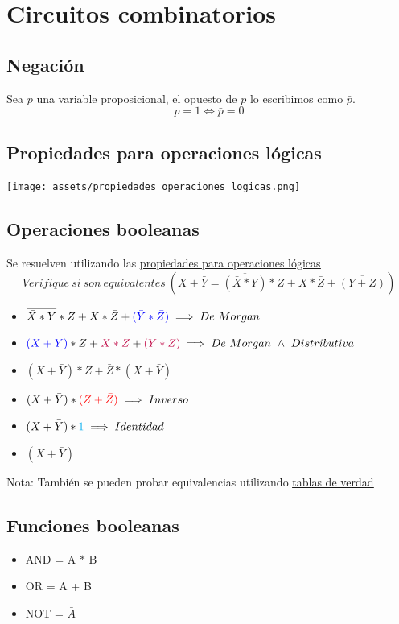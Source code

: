 \documentclass[10pt,a4paper]{article}
\begin{document}
\section{Circuitos combinatorios}
\subsection*{Negación}
Sea \(p\) una variable proposicional, el opuesto de \(p\) lo escribimos como \(\bar{p}\).
\[ p = 1 \iff \bar{p} = 0 \]

\subsection*{Propiedades para operaciones lógicas} 
\label{subsec:PPOL}
\begin{minipage}[b]{0.6\textwidth}
    \texttt{[image: assets/propiedades\_operaciones\_logicas.png]}
    \label{fig:propiedades_operaciones_logicas}
\end{minipage}
\subsection*{Operaciones booleanas}
Se resuelven utilizando las \hyperref[subsec:PPOL]{\underline{propiedades para operaciones lógicas}}
\[Verifique \ si \ son \ equivalentes \ (X + \bar{Y} = \overline{(\bar{X} \ast Y)} \ast Z + X \ast \bar{Z} + \overline{(Y+Z)})\]
\begin{itemize}
    \item  \(\overline{\bar{X} \ast Y} \ast Z + X \ast \bar{Z} + \textcolor{blue}{(\bar{Y} \ast \bar{Z})} \implies De \ Morgan\) 
    \item  \(\textcolor{blue}{(X + \bar{Y})} \ast Z + \textcolor{purple}{X \ast \bar{Z}} + \textcolor{purple}{(\bar{Y} \ast \bar{Z})}\implies De \ Morgan \ \land \ Distributiva \) 
    \item  \((X + \bar{Y}) \ast Z + \bar{Z} \ast (X + \bar{Y})\)
    \item  \((X + \bar{Y}) \ast \textcolor{red}{(Z + \bar{Z})} \implies Inverso\) 
    \item  \((X + \bar{Y}) \ast \textcolor{cyan}{1} \implies Identidad \) 
    \item  \((X + \bar{Y})\)
\end{itemize}
Nota: También se pueden probar equivalencias utilizando \hyperref[subsec:TDV]{\underline{tablas de verdad}}
\subsection*{Funciones booleanas}
\begin{itemize}
    \item AND = A \(\ast \) B
    \item OR = A + B
    \item NOT = \(\bar{A}\)
    \end{itemize} 
\end{document}

